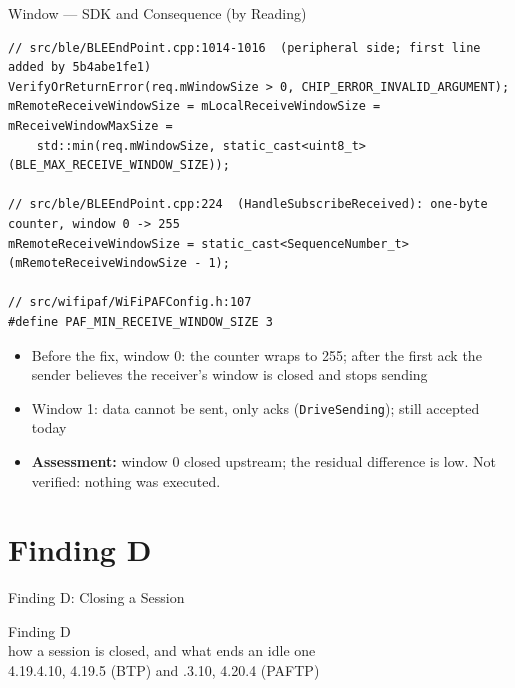 \documentclass[10pt,aspectratio=169,t]{beamer}
\begin{document}
\begin{frame}[fragile]{Window --- SDK and Consequence (by Reading)}
\begin{lstlisting}[style=cppsmall]
// src/ble/BLEEndPoint.cpp:1014-1016  (peripheral side; first line added by 5b4abe1fe1)
VerifyOrReturnError(req.mWindowSize > 0, CHIP_ERROR_INVALID_ARGUMENT);
mRemoteReceiveWindowSize = mLocalReceiveWindowSize = mReceiveWindowMaxSize =
    std::min(req.mWindowSize, static_cast<uint8_t>(BLE_MAX_RECEIVE_WINDOW_SIZE));

// src/ble/BLEEndPoint.cpp:224  (HandleSubscribeReceived): one-byte counter, window 0 -> 255
mRemoteReceiveWindowSize = static_cast<SequenceNumber_t>(mRemoteReceiveWindowSize - 1);

// src/wifipaf/WiFiPAFConfig.h:107
#define PAF_MIN_RECEIVE_WINDOW_SIZE 3
\end{lstlisting}
\begin{itemize}\small
  \item Before the fix, window 0: the counter wraps to 255; after the first ack
        the sender believes the receiver's window is closed and stops sending
  \item Window 1: data cannot be sent, only acks (\texttt{DriveSending}); still
        accepted today
  \item \textbf{Assessment:} window 0 closed upstream; the residual difference
        is low. Not verified: nothing was executed.
\end{itemize}
\end{frame}

\section{Finding D}

\begin{frame}{Finding D: Closing a Session}
\begin{center}
\Large Finding D\\[4pt]
\normalsize how a session is closed, and what ends an idle one\\[4pt]
\small 4.19.4.10, 4.19.5 (BTP) \quad and .3.10, 4.20.4 (PAFTP)
\end{center}
\end{frame}
\end{document}
